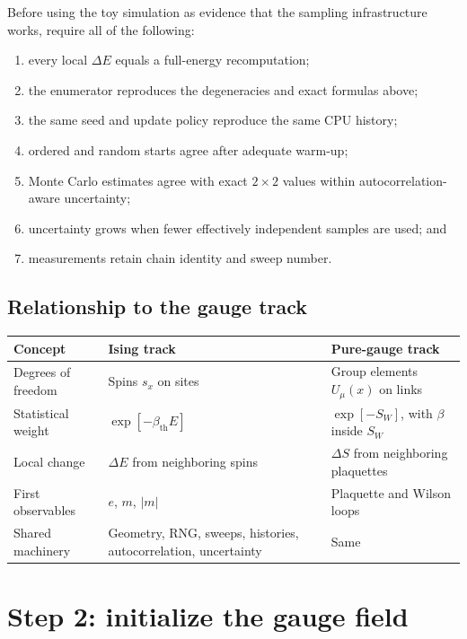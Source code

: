 \documentclass[11pt]{article}
\begin{document}
Before using the toy simulation as evidence that the sampling infrastructure
works, require all of the following:
\begin{enumerate}
  \item every local \(\Delta E\) equals a full-energy recomputation;
  \item the enumerator reproduces the degeneracies and exact formulas above;
  \item the same seed and update policy reproduce the same CPU history;
  \item ordered and random starts agree after adequate warm-up;
  \item Monte Carlo estimates agree with exact \(2\times2\) values within
        autocorrelation-aware uncertainty;
  \item uncertainty grows when fewer effectively independent samples are used;
        and
  \item measurements retain chain identity and sweep number.
\end{enumerate}

\subsection{Relationship to the gauge track}

\begin{center}
\begin{tabular}{@{}p{}p{}p{}@{}}
\toprule
Concept & Ising track & Pure-gauge track \\
\midrule
Degrees of freedom & Spins \(s_x\) on sites & Group elements \(U_\mu(x)\) on links \\
Statistical weight & \(\exp[-\beta_{\mathrm{th}}E]\) & \(\exp[-S_W]\), with \(\beta\) inside \(S_W\) \\
Local change & \(\Delta E\) from neighboring spins & \(\Delta S\) from neighboring plaquettes \\
First observables & \(e\), \(m\), \(|m|\) & Plaquette and Wilson loops \\
Shared machinery & Geometry, RNG, sweeps, histories, autocorrelation, uncertainty & Same \\
\bottomrule
\end{tabular}
\end{center}

\section{Step 2: initialize the gauge field}
\end{document}
